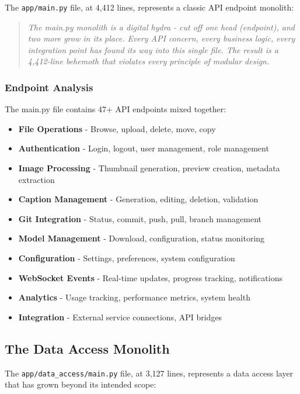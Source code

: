 \documentclass[11pt]{article}
\begin{document}
The \texttt{app/main.py} file, at 4,412 lines, represents a classic API endpoint monolith:

\begin{quote}
\emph{The main.py monolith is a digital hydra - cut off one head (endpoint), and two more grow in its place. Every API concern, every business logic, every integration point has found its way into this single file. The result is a 4,412-line behemoth that violates every principle of modular design.}
\end{quote}

\subsubsection{Endpoint Analysis}

The main.py file contains 47+ API endpoints mixed together:

\begin{itemize}
\item \textbf{File Operations} - Browse, upload, delete, move, copy
\item \textbf{Authentication} - Login, logout, user management, role management
\item \textbf{Image Processing} - Thumbnail generation, preview creation, metadata extraction
\item \textbf{Caption Management} - Generation, editing, deletion, validation
\item \textbf{Git Integration} - Status, commit, push, pull, branch management
\item \textbf{Model Management} - Download, configuration, status monitoring
\item \textbf{Configuration} - Settings, preferences, system configuration
\item \textbf{WebSocket Events} - Real-time updates, progress tracking, notifications
\item \textbf{Analytics} - Usage tracking, performance metrics, system health
\item \textbf{Integration} - External service connections, API bridges
\end{itemize}

\subsection{The Data Access Monolith}

The \texttt{app/data\_access/main.py} file, at 3,127 lines, represents a data access layer that has grown beyond its intended scope:
\end{document}
